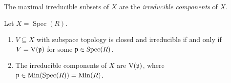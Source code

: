 \begin{definition}
    The maximal irreducible subsets of $X$ are the \emph{irreducible components} of $X$.
\end{definition}

\begin{proposition}
    Let $X = \operatorname{Spec}(R)$.
    \begin{enumerate}
        \item $V \subseteq X$ with subspace topology is closed and irreducible if and only if $V = \operatorname{V}(\mathfrak{p})$ for some $\mathfrak{p} \in \operatorname{Spec}(R)$.
        \item The irreducible components of $X$ are $\operatorname{V}(\mathfrak{p})$, where $\mathfrak{p} \in \operatorname{Min}(\operatorname{Spec}(R)) = \operatorname{Min}(R)$.
    \end{enumerate}
\end{proposition}

